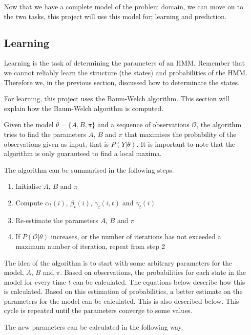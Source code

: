 Now that we have a complete model of the problem domain, we can move on to the two tasks, this project will use this model for; learning and prediction.

\subsection{Learning}\label{sec:learner}
Learning is the task of determining the parameters of an HMM. Remember that we cannot reliably learn the structure (the states) and probabilities of the HMM. Therefore we, in the previous section, discussed how to determinate the states.

For learning, this project uses the Baum-Welch algorithm\cite{hmmIntroduction}. This section will explain how the Baum-Welch algorithm is computed.

Given the model $\theta = \{A, B, \pi\}$ and a sequence of observations $\mathcal{O}$, the algorithm tries to find the parameters $A$, $B$ and $\pi$ that maximises the probability of the observations given as input, that is $P(Y | \theta)$. It is important to note that the algorithm is only guaranteed to find a local maxima.

The algorithm can be summarised in the following steps\cite{hmmIntroduction}.

\begin{enumerate}
\item Initialise $A$, $B$ and $\pi$
\item Compute $\alpha_t(i)$, $\beta_t(i)$, $\gamma_t(i,t)$ and $\gamma_t(i)$
\item Re-estimate the parameters $A$, $B$ and $\pi$
\item If $P(\mathcal{O} | \theta)$ increases, or the number of iterations has not exceeded a maximum number of iteration, repeat from step 2
\end{enumerate}

The idea of the algorithm is to start with some arbitrary parameters for the model, $A$, $B$ and $\pi$. Based on observations, the probabilities for each state in the model for every time $t$ can be calculated. The equations below describe how this is calculated. Based on this estimation of probabilities, a better estimate on the parameters for the model can be calculated. This is also described below. This cycle is repeated until the parameters converge to some values.

The new parameters can be calculated in the following way\cite{hmmIntroduction}.

